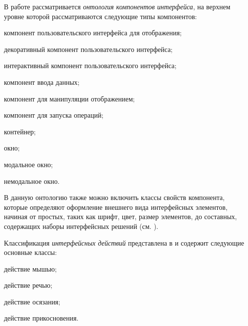 В работе  рассматривается \textit{онтология компонентов интерфейса}, на верхнем уровне которой рассматриваются следующие типы компонентов:
\begin{textitemize}
	\item компонент пользовательского интерфейса для отображения;
	\item декоративный компонент пользовательского интерфейса;
	\item интерактивный компонент пользовательского интерфейса;
	\item компонент ввода данных;
	\item компонент для манипуляции отображением;
	\item компонент для запуска операций;
	\item контейнер;
	\item окно;
	\item модальное окно;
	\item немодальное окно.
\end{textitemize}

В данную онтологию также можно включить классы свойств компонента, которые определяют оформление внешнего вида интерфейсных элементов, начиная от простых, таких как шрифт, цвет, размер элементов, до составных, содержащих наборы интерфейсных решений (см. ).

Классификация \textit{интерфейсных действий} представлена в  и содержит следующие основные классы:
\begin{textitemize}
	\item действие мышью;
	\item действие речью;
	\item действие осязания;
	\item действие прикосновения.
\end{textitemize}


